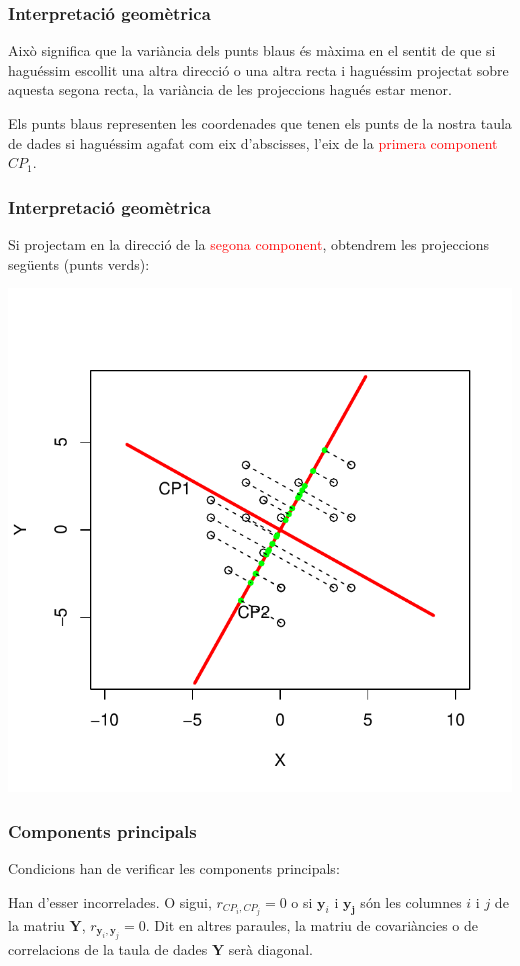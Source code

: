 \documentclass[12pt,t]{beamer}
\newcommand{\red}[1]{\textcolor{red}{#1}}
\theoremstyle{plain}
\theoremstyle{definition}
\begin{document}
\begin{frame}
\frametitle{Interpretació geomètrica}
Això significa que la variància dels punts blaus és màxima en el sentit de que si haguéssim escollit una altra direcció 
o una altra recta i haguéssim projectat sobre aquesta segona recta, la variància de les projeccions hagués estar menor.
\medskip

Els punts blaus representen les coordenades que tenen els punts de la nostra taula de dades si haguéssim agafat com eix 
d'abscisses, l'eix de la \red{primera component} $CP_1$.
\end{frame}

\begin{frame}
\frametitle{Interpretació geomètrica}
{\small Si projectam en la direcció de la \red{segona component}, obtendrem les projeccions següents (punts verds):}
\vspace*{-1cm}

\includegraphics{ACP2print-004}
\end{frame}


\begin{frame}
\frametitle{Components principals}
Condicions han de verificar les components principals:
\begin{block}{Han d'esser incorrelades.}
O sigui, $r_{CP_i,CP_j}=0$ o si $\mathbf{y}_i$ i $\mathbf{y_j}$ són les columnes $i$ i $j$ de la matriu $\mathbf{Y}$, 
$r_{\mathbf{y}_i,\mathbf{y}_j}=0$. Dit en altres paraules, la matriu de covariàncies o de correlacions de la taula de 
dades $\mathbf{Y}$ serà diagonal.
\end{block}
\end{frame}
\end{document}
